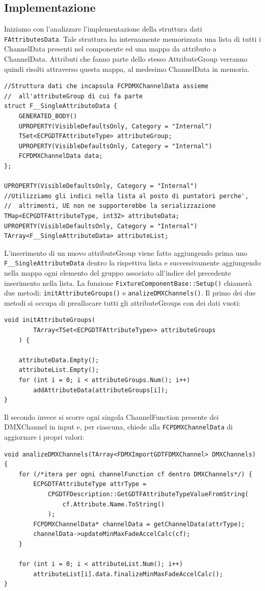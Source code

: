 \documentclass[main.tex]{subfiles}
\begin{document}
\subsection{Implementazione}\label{subsec:3_implementation}
Iniziamo con l'analizzare l'implementazione della struttura dati \lstinline{FAttributesData}. Tale struttura ha internamente memorizzata una lista di tutti i ChannelData presenti nel componente ed una mappa da attributo a ChannelData. Attributi che fanno parte dello stesso AttributeGroup verranno quindi risolti attraverso questa mappa, al medesimo ChannelData in memoria.
\lstset{language=UEcpp}
\begin{lstlisting}
//Struttura dati che incapsula FCPDMXChannelData assieme
//  all'attributeGroup di cui fa parte
struct F__SingleAttributeData {
    GENERATED_BODY()
    UPROPERTY(VisibleDefaultsOnly, Category = "Internal")
    TSet<ECPGDTFAttributeType> attributeGroup;
    UPROPERTY(VisibleDefaultsOnly, Category = "Internal")
    FCPDMXChannelData data;
};

UPROPERTY(VisibleDefaultsOnly, Category = "Internal")
//Utilizziamo gli indici nella lista al posto di puntatori perche',
//  altrimenti, UE non ne supporterebbe la serializzazione
TMap<ECPGDTFAttributeType, int32> attributeData;
UPROPERTY(VisibleDefaultsOnly, Category = "Internal")
TArray<F__SingleAttributeData> attributeList;
\end{lstlisting}
L'inserimento di un nuovo attributeGroup viene fatto aggiungendo prima uno \lstinline{F__SingleAttributeData} dentro la rispettiva lista e successivamente aggiungendo nella mappa ogni elemento del gruppo associato all'indice del precedente inserimento nella lista.\newline
La funzione \lstinline{FixtureComponentBase::Setup()} chiamerà due metodi: \lstinline{initAttributeGroups()} e \lstinline{analizeDMXChannels()}. Il primo dei due metodi si occupa di preallocare tutti gli attributeGroups con dei dati vuoti:
\begin{lstlisting}
void initAttributeGroups(
        TArray<TSet<ECPGDTFAttributeType>> attributeGroups
    ) {

    attributeData.Empty();
    attributeList.Empty();
    for (int i = 0; i < attributeGroups.Num(); i++)
        addAttributeData(attributeGroups[i]);
}
\end{lstlisting}
Il secondo invece si scorre ogni singola ChannelFunction presente dei DMXChannel in input e, per ciascuna, chiede alla \lstinline{FCPDMXChannelData} di aggiornare i propri valori:
\begin{lstlisting}
void analizeDMXChannels(TArray<FDMXImportGDTFDMXChannel> DMXChannels) {
    for (/*itera per ogni channelFunction cf dentro DMXChannels*/) {
        ECPGDTFAttributeType attrType =
            CPGDTFDescription::GetGDTFAttributeTypeValueFromString(
                cf.Attribute.Name.ToString()
            );
        FCPDMXChannelData* channelData = getChannelData(attrType);
        channelData->updateMinMaxFadeAccelCalc(cf);
    }

    for (int i = 0; i < attributeList.Num(); i++)
        attributeList[i].data.finalizeMinMaxFadeAccelCalc();
}
\end{lstlisting}
\end{document}
